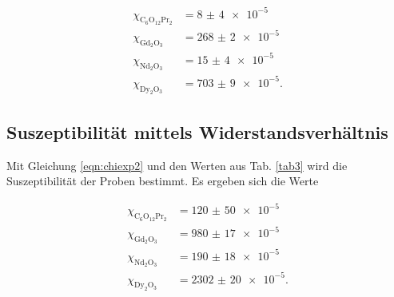 \begin{align*} 
   \chi_{\text{C}_6 \text{O}_{12} \text{Pr}_2} &= \num{8(4)e-5}\\ %
   \chi_{\text{Gd}_2 \text{O}_3} &= \num{268(2)e-5}\\
   \chi_{\text{Nd}_2 \text{O}_3} &= \num{15(4)e-5}\\
   \chi_{\text{Dy}_2 \text{O}_3} &= \num{703(9)e-5}.
\end{align*}


\subsection{Suszeptibilität mittels Widerstandsverhältnis}
Mit Gleichung \eqref{eqn:chiexp2} und den Werten aus Tab. \ref{tab3}
wird die Suszeptibilität der Proben bestimmt.
Es ergeben sich die Werte

\begin{align*} 
   \chi_{\text{C}_6 \text{O}_{12} \text{Pr}_2} &= \num{120(50)e-5}\\
   \chi_{\text{Gd}_2 \text{O}_3} &= \num{980(17)e-5}\\
   \chi_{\text{Nd}_2 \text{O}_3} &= \num{190(18)e-5}\\
   \chi_{\text{Dy}_2 \text{O}_3} &= \num{2302(20)e-5}.
\end{align*}
